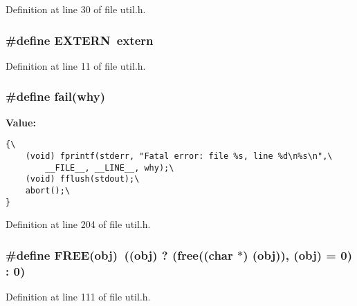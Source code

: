 Definition at line 30 of file util.h.
\subsubsection{\setlength{\rightskip}{0pt plus 5cm}\#define EXTERN~extern}\label{util_8h_77366c1bd428629dc898e188bfd182a3}




Definition at line 11 of file util.h.
\subsubsection{\setlength{\rightskip}{0pt plus 5cm}\#define fail(why)}\label{util_8h_71a6998301cde817b7ade39eff117424}


\textbf{Value:}

\begin{Code}\begin{verbatim}{\
    (void) fprintf(stderr, "Fatal error: file %s, line %d\n%s\n",\
        __FILE__, __LINE__, why);\
    (void) fflush(stdout);\
    abort();\
}
\end{verbatim}\end{Code}


Definition at line 204 of file util.h.
\subsubsection{\setlength{\rightskip}{0pt plus 5cm}\#define FREE(obj)~((obj) ? (free((char $\ast$) (obj)), (obj) = 0) : 0)}\label{util_8h_a279a8302d25fa9dfeb3e00161aee784}




Definition at line 111 of file util.h.


